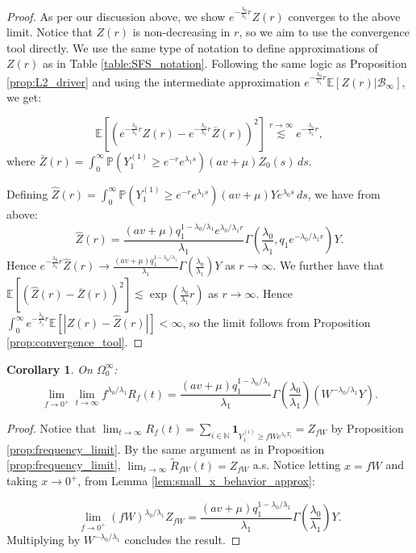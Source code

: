 \documentclass{article}
\numberwithin{equation}{section}
\newtheorem{corollary}[theorem]{Corollary}
\newcommand{\lsimas}[2]{\overset{{#1}\to {#2}}{\lesssim}}
\begin{document}
\begin{proof}
  As per our discussion above, we show $e^{-\frac{\lambda_0}{\lambda_1}r}Z(r)$ converges to the above limit. Notice that $Z(r)$ is non-decreasing in $r$, so we aim to use the convergence tool directly. We use the same type of notation to define approximations of $Z(r)$ as in Table \ref{table:SFS_notation}. Following the same logic as Proposition \ref{prop:L2_driver} and using the intermediate approximation $e^{-\frac{\lambda_0}{\lambda_1}r}\mathbb{E}[Z(r)|\mathcal{B}_\infty]$, we get:

\[\mathbb{E}\left[\left(e^{-\frac{\lambda_0}{\lambda_1}r}Z(r)-e^{-\frac{\lambda_0}{\lambda_1}r}\overline{Z}(r)\right)^2\right]\lsimas{r}{\infty} e^{-\frac{\lambda_0}{\lambda_1}r},\]
where $\overline{Z}(r)=\int_0^\infty \mathbb{P}(Y_1^{(1)}\geq e^{-r}e^{\lambda_1 s})(av+\mu)Z_0(s)\,ds$.

Defining $\widehat{Z}(r)=\int_0^\infty \mathbb{P}(Y_1^{(1)}\geq e^{-r}e^{\lambda_1 s})(av+\mu)Ye^{\lambda_0 s}\,ds$, we have from above:
\[\widehat{Z}(r)=\frac{(av+\mu) q_1^{1-\lambda_0/\lambda_1}e^{\lambda_0/\lambda_1 r}}{\lambda_1}\Gamma(\frac{\lambda_0}{\lambda_1},q_1 e^{-\lambda_0/\lambda_1 r})Y.\]
Hence $e^{-\frac{\lambda_0}{\lambda_1}r}\widehat{Z}(r)\to \frac{(av+\mu) q_1^{1-\lambda_0/\lambda_1}}{\lambda_1}\Gamma(\frac{\lambda_0}{\lambda_1})Y$ as $r\to\infty$. We further have that $\mathbb{E}\left[\left(\widehat{Z}(r)-\overline{Z}(r)\right)^2\right]\lesssim \exp\left(\frac{\lambda_0}{\lambda_1}r\right)$ as $r\to\infty$.
Hence $\int_0^\infty e^{-\frac{\lambda_0}{\lambda_1}r}\mathbb{E}[|Z(r)-\widehat{Z}(r)|]<\infty$, so the limit follows from Proposition \ref{prop:convergence_tool}.
\end{proof}

\begin{corollary}
  On $\Omega_0^\infty$:
\[
\lim_{f\to0^+}\lim_{t\to\infty}f^{\lambda_0/\lambda_1}R_f(t)=\frac{(av+\mu)q_1^{1-\lambda_0/\lambda_1}}{\lambda_1}\Gamma\left(\frac{\lambda_0}{\lambda_1}\right)(W^{-\lambda_0/\lambda_1}Y).
\]
  
\end{corollary}

\begin{proof}
  Notice that $\lim_{t\to\infty}R_f(t)=\sum_{i\in \mathbb{N}}\mathbf{1}_{Y_1^{(i)}\geq fW e^{\lambda_1 T_i}}=Z_{fW}$ by Proposition \ref{prop:frequency_limit}. By the same argument as in Proposition \ref{prop:frequency_limit}, $\lim_{t\to\infty}\widetilde{R}_{fW}(t)=Z_{fW}$ a.s. Notice letting $x=fW$ and taking $x\to 0^+$, from Lemma \ref{lem:small_x_behavior_approx}:

  \[\lim_{f\to 0^+}(fW)^{\lambda_0/\lambda_1}Z_{fW}=\frac{(av+\mu)q_1^{1-\lambda_0/\lambda_1}}{\lambda_1}\Gamma\left(\frac{\lambda_0}{\lambda_1}\right)Y.\]
  Multiplying by $W^{-\lambda_0/\lambda_1}$ concludes the result.
\end{proof}
\end{document}
